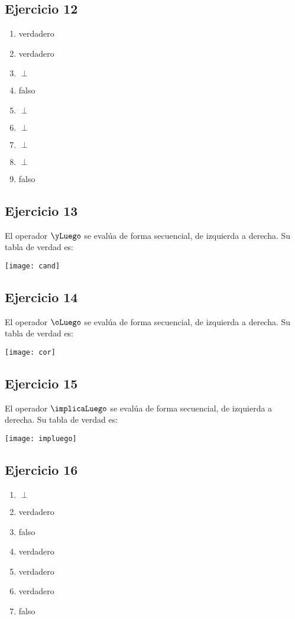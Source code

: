 \subsection{Ejercicio 12}
\begin{enumerate}[label=(\alph*)]
    \item verdadero
    \item verdadero
    \item $\perp$
    \item falso
    \item $\perp$
    \item $\perp$
    \item $\perp$
    \item $\perp$
    \item falso
\end{enumerate}

\subsection{Ejercicio 13}
El operador $\yLuego$ se evalúa de forma secuencial, de izquierda a derecha. Su tabla de verdad es:

\texttt{[image: cand]}

\subsection{Ejercicio 14}
El operador $\oLuego$ se evalúa de forma secuencial, de izquierda a derecha. Su tabla de verdad es:

\texttt{[image: cor]}

\subsection{Ejercicio 15}
El operador $\implicaLuego$ se evalúa de forma secuencial, de izquierda a derecha. Su tabla de verdad es:

\texttt{[image: impluego]}

\subsection{Ejercicio 16}
\begin{enumerate}[label=(\alph*)]
    \item $\perp$
    \item verdadero
    \item falso
    \item verdadero
    \item verdadero
    \item verdadero
    \item falso
\end{enumerate}

